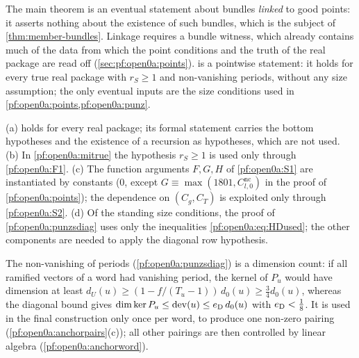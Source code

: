 \begin{remark}\label{pf:open0a:rem:vacuity}
The main theorem is an eventual statement about bundles \emph{linked} to good points: it asserts nothing about the
existence of such bundles, which is the subject of \cref{thm:member-bundles}. Linkage requires a bundle witness, which
already contains much of the data from which the point conditions and the truth of the real package are read off
(\cref{sec:pf:open0a:points}).  is a pointwise statement: it holds for every true real package
with $r_S\ge1$ and non-vanishing periods, without any size assumption; the only eventual inputs are the size
conditions used in \cref{pf:open0a:points,pf:open0a:punz}.
\end{remark}

\begin{remark}\label{pf:open0a:rem:unused}
(a)  holds for every real package; its formal statement carries the bottom hypotheses and the
existence of a recursion as hypotheses, which are not used.
(b) In \cref{pf:open0a:mitrue} the hypothesis $r_S\ge1$ is used only through \ref{pf:open0a:F1}.
(c) The function arguments $F,G,H$ of \ref{pf:open0a:S1} are instantiated by constants ($0$, except
$G\equiv\max(1801,C^{\mathrm{nc}}_{l,0})$ in the proof of \cref{pf:open0a:points}); the dependence on $(C_g,C_T)$ is
exploited only through \ref{pf:open0a:S2}.
(d) Of the standing size conditions, the proof of \cref{pf:open0a:punzsdiag} uses only the inequalities
\eqref{pf:open0a:eq:HDused}; the other components are needed to apply the diagonal row hypothesis.
\end{remark}

\begin{remark}\label{pf:open0a:rem:punz}
The non-vanishing of periods (\cref{pf:open0a:punzsdiag}) is a dimension count: if all ramified vectors of a word had
vanishing period, the kernel of $P_u$ would have dimension at least $d_U(u)\ge(1-f/(T_u-1))\,d_0(u)\ge\frac34d_0(u)$,
whereas the diagonal bound gives $\dim\ker P_u\le\operatorname{dev}(u)\le e_{\mathrm{D}}\,d_0(u)$ with $e_{\mathrm{D}}<\frac18$.
It is used in the final construction only once per word, to produce one non-zero pairing
(\cref{pf:open0a:anchorpairs}(c)); all other pairings are then controlled by linear algebra
(\cref{pf:open0a:anchorword}).
\end{remark}
